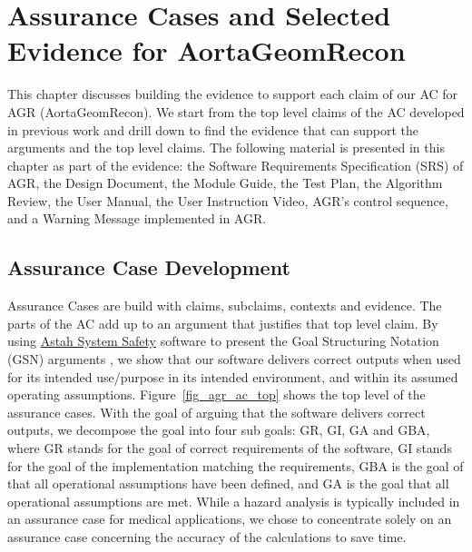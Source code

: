 \chapter{Assurance Cases and Selected Evidence for AortaGeomRecon}

This chapter discusses building the evidence to support each claim of our AC  for AGR (AortaGeomRecon). We start from the top level claims of the AC developed in previous work \cite{scs_ac} and drill down to find the evidence that can support the arguments and the top level claims. The following material is presented in this chapter as part of the evidence: the Software Requirements Specification (SRS) of AGR, the Design Document, the Module Guide, the Test Plan, the Algorithm Review,  the User Manual, the User Instruction Video, AGR's control sequence, and a Warning Message implemented in AGR.

\section{Assurance Case Development}

Assurance Cases are build with claims, subclaims, contexts and evidence. The parts of  the AC  add up  to an argument that justifies that top level claim. By using \href{https://astah.net/products/astah-system-safety/}{Astah System Safety} software to present the Goal Structuring Notation (GSN) arguments \cite{Astah_2023}\cite{kelly2004goal}, we show that our software delivers correct outputs when used for its intended use/purpose in its intended environment, and within its assumed operating assumptions. Figure~\ref{fig_agr_ac_top} shows the top level of the assurance cases. With the goal of arguing that the software delivers correct outputs, we decompose the goal into four sub goals: GR, GI, GA and GBA, where GR stands for the goal of correct requirements of the software, GI stands for the goal of the implementation  matching the requirements, GBA is the goal of  that all  operational assumptions have been defined, and GA is the goal that all operational assumptions are met. While a hazard analysis is typically included in an assurance case for medical applications, we chose to concentrate solely on an assurance case concerning the accuracy of the calculations to save time.


